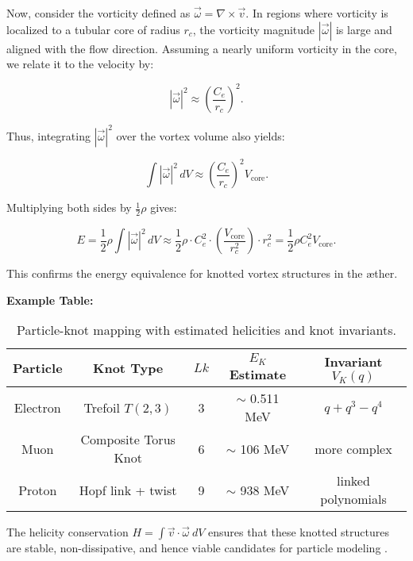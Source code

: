 Now, consider the vorticity defined as $\vec{\omega} = \nabla \times \vec{v}$.
In regions where vorticity is localized to a tubular core of radius $r_c$, the vorticity magnitude $|\vec{\omega}|$ is large and aligned with the flow direction. Assuming a nearly uniform vorticity in the core, we relate it to the velocity by:

\begin{equation}
    |\vec{\omega}|^2 \approx \left(\frac{C_e}{r_c}\right)^2.
\end{equation}

Thus, integrating $|\vec{\omega}|^2$ over the vortex volume also yields:

\begin{equation}
    \int |\vec{\omega}|^2 \, dV \approx \left(\frac{C_e}{r_c}\right)^2 V_{\text{core}}.
\end{equation}

Multiplying both sides by $\frac{1}{2} \rho$ gives:

\begin{equation}
    E = \frac{1}{2} \rho \int |\vec{\omega}|^2 \, dV \approx \frac{1}{2} \rho \cdot C_e^2 \cdot \left(\frac{V_{\text{core}}}{r_c^2}\right) \cdot r_c^2 = \frac{1}{2} \rho C_e^2 V_{\text{core}}.
\end{equation}

This confirms the energy equivalence for knotted vortex structures in the æther.

\textbf{Example Table:}

\begin{table}[h!]
    \centering
    \begin{tabular}{|c|c|c|c|c|}
        \hline
        \textbf{Particle} & \textbf{Knot Type} & $Lk$ & $E_K$ Estimate & Invariant $V_K(q)$ \\
        \hline
        Electron & Trefoil $T(2,3)$ & 3 & $\sim$ 0.511 MeV & $q + q^3 - q^4$ \\
        Muon & Composite Torus Knot & 6 & $\sim$ 106 MeV & more complex \\
        Proton & Hopf link + twist & 9 & $\sim$ 938 MeV & linked polynomials \\
        \hline
    \end{tabular}
    \caption{Particle-knot mapping with estimated helicities and knot invariants.}
\end{table}

The helicity conservation $H = \int \vec{v} \cdot \vec{\omega} \ dV$ ensures that these knotted structures are stable, non-dissipative, and hence viable candidates for particle modeling \cite{Moffatt1969, Ricca1992}.